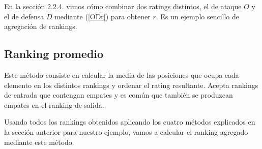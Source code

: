 En la sección 2.2.4. vimos cómo combinar dos ratings distintos, el de ataque $O$ y el de defensa $D$ mediante (\ref{ODr}) para obtener $r$. Es un ejemplo sencillo de agregación de rankings.\\

\subsection{Ranking promedio}

Este método consiste en calcular la media de las posiciones que ocupa cada elemento en los distintos rankings y ordenar el rating resultante. Acepta rankings de entrada que contengan empates y es común que también se produzcan empates en el ranking de salida.\\

\newpage

\begin{ejem} Usando todos los rankings obtenidos aplicando los cuatro métodos explicados en la sección anterior para nuestro ejemplo, vamos a calcular el ranking agregado mediante este método.
\end{ejem}
	
